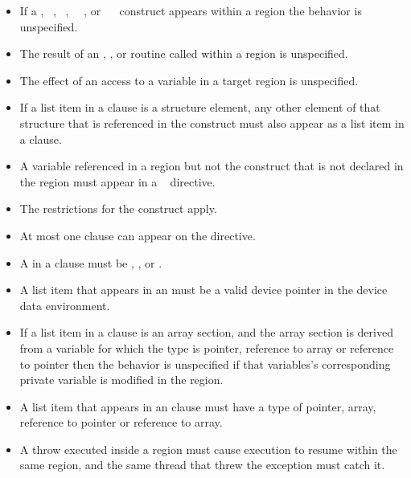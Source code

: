 \restrictions
\begin{itemize}
\item If a , ~, 
~, ~~, or 
~~ construct appears within a 
 region the behavior is unspecified.

\item The result of an , 
, or  
routine called within a  region is unspecified.

\item The effect of an access to a  variable in a target region is 
unspecified.

\item If a list item in a  clause is a structure element, any other 
element of that structure that is referenced in the  construct 
must also appear as a list item in a  clause.

\item A variable referenced in a  region but not the  construct that is not 
declared in the  region must appear in a ~ directive. 

\item The restrictions for the  construct apply.

\item At most one  clause can appear on the directive.

\item A  in a  clause must be , ,  or .
  \item A list item that appears in an  must be a valid
    device pointer in the device data environment.

\ccppspecificstart
\item If a list item in a  clause is an array section, and the array section is derived from a variable for which the type is pointer, reference to array or reference to pointer then the behavior is unspecified if that variables's corresponding private variable is modified in the region.
\ccppspecificend

\cppspecificstart
\item A list item that appears in an  clause must have a type
  of pointer, array, reference to pointer or reference to array.
\item A throw executed inside a  region must cause execution to resume within the
same  region, and the same thread that threw the exception must catch it. 
\cppspecificend


\end{itemize}
